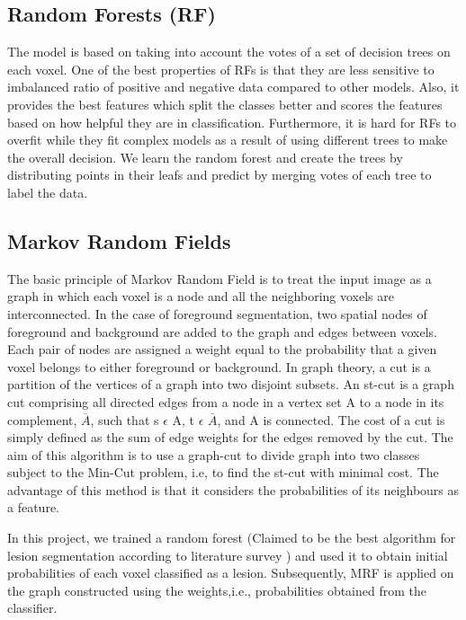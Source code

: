 \documentclass{article} %
\begin{document}
\subsection{Random Forests (RF)} 
The model is based on taking into account the votes of a set of decision trees on each voxel. One of the best properties of RFs is that they are less sensitive to imbalanced ratio of positive and negative data compared to other models. Also, it provides the best features which split the classes better and scores the features based on how helpful they are in classification. Furthermore, it is hard for RFs to overfit while they fit complex models as a result of using different trees to make the overall decision. We learn the random forest and create the trees by distributing points in their leafs and predict by merging votes of each tree to label the data.

\subsection{Markov Random Fields}
The basic principle of Markov Random Field is to treat the input image as a graph in which each voxel is a node and all the neighboring voxels are interconnected. In the case of foreground segmentation, two spatial nodes of foreground and background are added to the graph and edges between voxels. Each pair of nodes are assigned a weight equal to the probability that a given voxel belongs to either foreground or background. In graph theory, a cut is a partition of the vertices of a graph into two disjoint subsets. An st-cut is a graph cut comprising all directed edges from a node in a vertex set A to a node in its complement, $\overline{A}$, such that s $\epsilon$ A, t $\epsilon$ $\overline{A}$, and A is connected. The cost of a cut is simply defined as the sum of edge weights for the edges removed by the cut. The aim of this algorithm is to use a graph-cut to divide graph into two classes subject to the Min-Cut problem, i.e, to find the st-cut with minimal cost. The advantage of this method is that it considers the probabilities of its neighbours as a feature.

In this project, we trained a random forest (Claimed to be the best algorithm for lesion segmentation according to literature survey \cite{garcia2013review}) and used it to obtain initial probabilities of each voxel classified as a lesion. Subsequently, MRF is applied on the graph constructed using the weights,i.e., probabilities obtained from the classifier.
\end{document}
